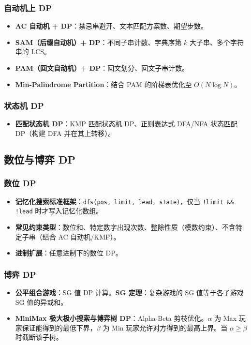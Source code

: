 \subsubsection{自动机上 DP}
\begin{itemize}
    \item \textbf{AC 自动机 + DP}：禁忌串避开、文本匹配方案数、期望步数。
    \item \textbf{SAM（后缀自动机）+ DP}：不同子串计数、字典序第 $k$ 大子串、多个字符串的 LCS。
    \item \textbf{PAM（回文自动机）+ DP}：回文划分、回文子串计数。
    \item \textbf{Min-Palindrome Partition}：结合 PAM 的阶梯表优化至 $O(N \log N)$。
\end{itemize}

\subsubsection{状态机 DP}
\begin{itemize}
    \item \textbf{匹配状态机 DP}：KMP 匹配状态机 DP、正则表达式 DFA/NFA 状态匹配 DP（构建 DFA 并在其上转移）。
\end{itemize}


\subsection{数位与博弈 DP}

\subsubsection{数位 DP}
\begin{itemize}
    \item \textbf{记忆化搜索标准框架}：\texttt{dfs(pos, limit, lead, state)}，仅当 \texttt{!limit \&\& !lead} 时才写入记忆化数组。
    \item \textbf{常见约束类型}：数位和、特定数字出现次数、整除性质（模数约束）、不含特定子串（结合 AC 自动机/KMP）。
    \item \textbf{进制扩展}：任意进制下的数位 DP。
\end{itemize}

\subsubsection{博弈 DP}
\begin{itemize}
    \item \textbf{公平组合游戏}：SG 值 DP 计算。\textbf{SG 定理}：复杂游戏的 SG 值等于各子游戏 SG 值的异或和。
    \item \textbf{MiniMax 极大极小搜索与博弈树 DP}：Alpha-Beta 剪枝优化。$\alpha$ 为 Max 玩家保证能得到的最低下界，$\beta$ 为 Min 玩家允许对方得到的最高上界。当 $\alpha \ge \beta$ 时截断该子树。
\end{itemize}


